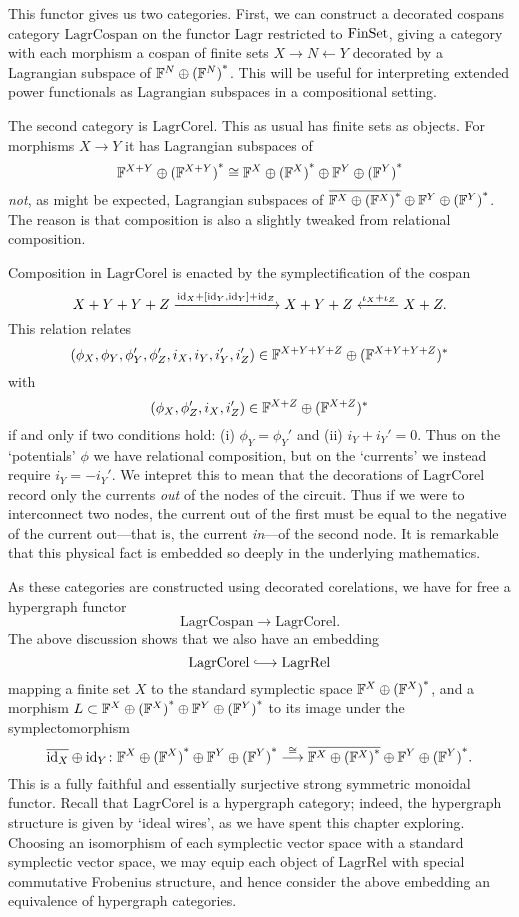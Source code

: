 This functor gives us two categories. First, we can construct a decorated
cospans category $\mathrm{LagrCospan}$ on the functor $\mathrm{Lagr}$ restricted
to $\mathrm{FinSet}$, giving a category with each morphism a cospan of finite sets $X
\to N \leftarrow Y$ decorated by a Lagrangian subspace of ${{\mathbb F}^{N} \oplus {({\mathbb F}^{N})}^\ast}$. This will
be useful for interpreting extended power functionals as Lagrangian subspaces in
a compositional setting. 

The second category is $\mathrm{LagrCorel}$. This as usual has finite sets as
objects. For morphisms $X \to Y$ it has Lagrangian subspaces of 
\[
  {{\mathbb F}^{X+Y} \oplus {({\mathbb F}^{X+Y})}^\ast} \cong {{\mathbb F}^{X} \oplus {({\mathbb F}^{X})}^\ast} \oplus {{\mathbb F}^{Y} \oplus {({\mathbb F}^{Y})}^\ast}
\]
\emph{not}, as might be expected, Lagrangian subspaces of $\overline{{{\mathbb F}^{X} \oplus {({\mathbb F}^{X})}^\ast}}
\oplus {{\mathbb F}^{Y} \oplus {({\mathbb F}^{Y})}^\ast}$. The reason is that composition is also a slightly tweaked
from relational composition. 

Composition in $\mathrm{LagrCorel}$ is enacted by the symplectification of the
cospan 
\[
  X+Y+Y+Z \xrightarrow{\mathrm{id}_X+[\mathrm{id}_Y,\mathrm{id}_Y]+\mathrm{id}_Z} X+Y+Z
  \xleftarrow{\iota_X+\iota_Z} X+Z.
\]
This relation relates 
\[
  (\phi_X,\phi_Y,\phi_Y',\phi_Z',i_X,i_Y,i_Y',i_Z') \in 
  {\mathbb F}^{X+Y+Y+Z}\oplus ({\mathbb F}^{X+Y+Y+Z})^\ast
\]
with 
\[
  (\phi_X,\phi_Z',i_X,i_Z') \in {\mathbb F}^{X+Z}\oplus ({\mathbb F}^{X+Z})^\ast
\]
if and only if two conditions hold: (i) $\phi_Y = \phi_Y'$ and (ii) $i_Y +i_Y' =
0$. Thus on the `potentials' $\phi$ we have relational composition, but on the
`currents' we instead require $i_Y=-i_Y'$. We intepret this to mean that the
decorations of $\mathrm{LagrCorel}$ record only the currents \emph{out} of the
nodes of the circuit. Thus if we were to interconnect two nodes, the current out
of the first must be equal to the negative of the current out---that is, the
current \emph{in}---of the second node. It is remarkable that this physical fact
is embedded so deeply in the underlying mathematics.

As these categories are constructed using decorated corelations, we have for
free a hypergraph functor 
\[
  \mathrm{LagrCospan} \longrightarrow \mathrm{LagrCorel}.
\]
The above discussion shows that we also have an embedding 
\[
  \mathrm{LagrCorel} \hooklongrightarrow \mathrm{LagrRel}
\]
mapping a finite set $X$ to the standard symplectic space ${{\mathbb F}^{X} \oplus {({\mathbb F}^{X})}^\ast}$, and a
morphism $L \subset {{\mathbb F}^{X} \oplus {({\mathbb F}^{X})}^\ast} \oplus {{\mathbb F}^{Y} \oplus {({\mathbb F}^{Y})}^\ast}$ to its image under the
symplectomorphism 
\[
  \overline{\mathrm{id}_X} \oplus \mathrm{id}_Y {\colon}{{\mathbb F}^{X} \oplus {({\mathbb F}^{X})}^\ast} \oplus {{\mathbb F}^{Y} \oplus {({\mathbb F}^{Y})}^\ast}
  \stackrel{\cong}\longrightarrow \overline{{{\mathbb F}^{X} \oplus {({\mathbb F}^{X})}^\ast}} \oplus {{\mathbb F}^{Y} \oplus {({\mathbb F}^{Y})}^\ast}.
\]
This is a fully faithful and essentially surjective strong symmetric monoidal
functor. Recall that $\mathrm{LagrCorel}$ is a hypergraph category; indeed, the
hypergraph structure is given by `ideal wires', as we have spent this chapter
exploring. Choosing an isomorphism of each symplectic vector space with a
standard symplectic vector space, we may equip each object of $\mathrm{LagrRel}$
with special commutative Frobenius structure, and hence consider the above
embedding an equivalence of hypergraph categories.

